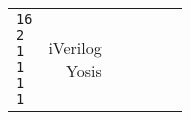 \begin{center}
\begin{longtable}{|lr|c|c|c|c|}
{                 \texttt{16}          \\
                 \texttt{2}           \\
                 \texttt{1}           \\
                 \texttt{1}           \\
                 \texttt{1}           \\
                 \texttt{1}}             &     
    \makecell[c]{iVerilog~\cite{iverilog} \\                    
                 Yosis~\cite{yosys}}     &
    & & \\
  \end{longtable}
\end{center}
  

